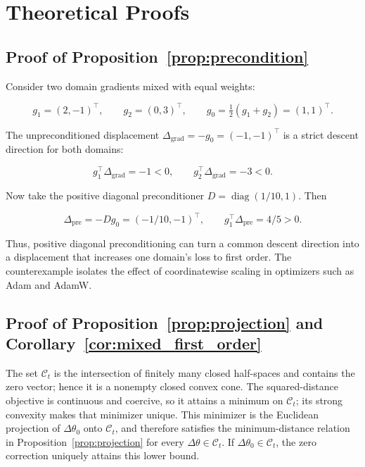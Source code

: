 \documentclass{article}
\begin{document}
\section{Theoretical Proofs}
\label{app:theoretical_proofs}

\subsection{Proof of Proposition~\ref{prop:precondition}}
\label{app:proof_precondition}

Consider two domain gradients mixed with equal weights:

\[
g_1=(2,-1)^\top,\qquad g_2=(0,3)^\top,
\qquad g_0=\tfrac12(g_1+g_2)=(1,1)^\top.
\]

The unpreconditioned displacement $\Delta_{\mathrm{grad}}=-g_0=(-1,-1)^\top$ is a strict descent direction for both domains:

\[
g_1^\top\Delta_{\mathrm{grad}}=-1<0,
\qquad
g_2^\top\Delta_{\mathrm{grad}}=-3<0.
\]

Now take the positive diagonal preconditioner $D=\operatorname{diag}(1/10,1)$. Then

\[
\Delta_{\mathrm{pre}}=-Dg_0=(-1/10,-1)^\top,
\qquad
g_1^\top\Delta_{\mathrm{pre}}=4/5>0.
\]

Thus, positive diagonal preconditioning can turn a common descent direction into a displacement that increases one domain's loss to first order. The counterexample isolates the effect of coordinatewise scaling in optimizers such as Adam and AdamW. 

\subsection{Proof of Proposition~\ref{prop:projection} and Corollary~\ref{cor:mixed_first_order}}
\label{app:proof_projection}

The set $\mathcal C_t$ is the intersection of finitely many closed half-spaces and contains the zero vector; hence it is a nonempty closed convex cone. The squared-distance objective is continuous and coercive, so it attains a minimum on $\mathcal C_t$; its strong convexity makes that minimizer unique. This minimizer is the Euclidean projection of $\Delta\theta_0$ onto $\mathcal C_t$, and therefore satisfies the minimum-distance relation in Proposition~\ref{prop:projection} for every $\Delta\theta\in\mathcal C_t$. If $\Delta\theta_0\in\mathcal C_t$, the zero correction uniquely attains this lower bound.
\end{document}
